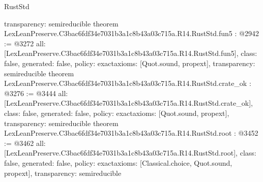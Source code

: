 \begin{lexlean}{RustStd}
\begin{coremodule}
{  transparency: semireducible
}
theorem LexLeanPreserve.C3bac6fdf34e7031b3a1c8b43a03c715a.R14.RustStd.fun5 : @2942 := @3272 {
  all: [LexLeanPreserve.C3bac6fdf34e7031b3a1c8b43a03c715a.R14.RustStd.fun5],
  class: false,
  generated: false,
  policy: exact{axioms: [Quot.sound, propext]},
  transparency: semireducible
}
theorem LexLeanPreserve.C3bac6fdf34e7031b3a1c8b43a03c715a.R14.RustStd.crate_ok : @3276 := @3444 {
  all: [LexLeanPreserve.C3bac6fdf34e7031b3a1c8b43a03c715a.R14.RustStd.crate_ok],
  class: false,
  generated: false,
  policy: exact{axioms: [Quot.sound, propext]},
  transparency: semireducible
}
theorem LexLeanPreserve.C3bac6fdf34e7031b3a1c8b43a03c715a.R14.RustStd.root : @3452 := @3462 {
  all: [LexLeanPreserve.C3bac6fdf34e7031b3a1c8b43a03c715a.R14.RustStd.root],
  class: false,
  generated: false,
  policy: exact{axioms: [Classical.choice, Quot.sound, propext]},
  transparency: semireducible
}


\end{coremodule}
\end{lexlean}
